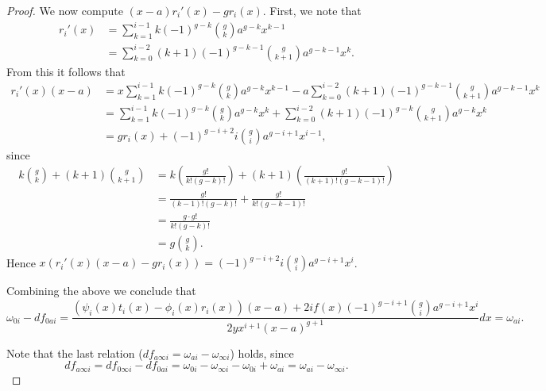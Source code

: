 \begin{proof}
    
    We now compute $(x-a)r_i'(x)-gr_i(x)$.
    First, we note that
        \begin{align*}
        r_i'(x) & = \sum_{k=1}^{i-1} k (-1)^{g-k} \binom{g}{k} a^{g-k} x^{k-1} \\
        & = \sum_{k=0}^{i-2} (k+1) (-1)^{g-k-1} \binom{g}{k+1}a^{g-k-1} x^k.
        \end{align*}
    From this it follows that
        \begin{align*}
        r_i'(x)(x-a) & = x \sum_{k=1}^{i-1} k (-1)^{g-k} \binom{g}{k} a^{g-k} x^{k-1} - a \sum_{k=0}^{i-2} (k+1) (-1)^{g-k-1} \binom{g}{k+1}a^{g-k-1} x^k \\
        & = \sum_{k=1}^{i-1} k (-1)^{g-k} \binom{g}{k} a^{g-k} x^k  + \sum_{k=0}^{i-2} (k+1) (-1)^{g-k} \binom{g}{k+1}a^{g-k} x^k \\
        & = gr_i(x) + (-1)^{g-i+2}i \binom{g}{i}a^{g-i+1}x^{i-1},
        \end{align*}
    since
        \begin{align*}
        k\binom{g}{k} + (k+1)\binom{g}{k+1} & = k \left( \frac{g!}{k!(g-k)!} \right) + (k+1) \left( \frac{g!}{(k+1)!(g-k-1)!} \right) \\
        & = \frac{g!}{(k-1)!(g-k)!} + \frac{g!}{k!(g-k-1)!} \\
        & = \frac{g\cdot g!}{k!(g-k)!} \\
        & = g \binom{g}{k}.
        \end{align*}
    Hence $x(r_i'(x)(x-a)-gr_i(x))= (-1)^{g-i+2}i\binom{g}{i} a^{g-i+1}x^i$.
    
    Combining the above we conclude that
        \[
        \omega_{0 i } - df_{0a i} =  \frac{(\psi_i(x)t_i(x) - \phi_i(x)r_i(x))(x-a) + 2if(x)(-1)^{g-i+1}\binom{g}{i} a^{g-i+1}x^i}{2yx^{i+1}(x-a)^{g+1}}dx= \omega_{a i}.
        \]
    
    Note that the last relation ($df_{a \infty i} = \omega_{a i} - \omega_{\infty i}$) holds, since 
        \[
        df_{a \infty i} = df_{0 \infty i} - df_{0 a i} = \omega_{0 i} - \omega_{\infty i } - \omega_{0 i} + \omega_{a i} = \omega_{a i} - \omega_{\infty i}.
        \]
    \end{proof}

